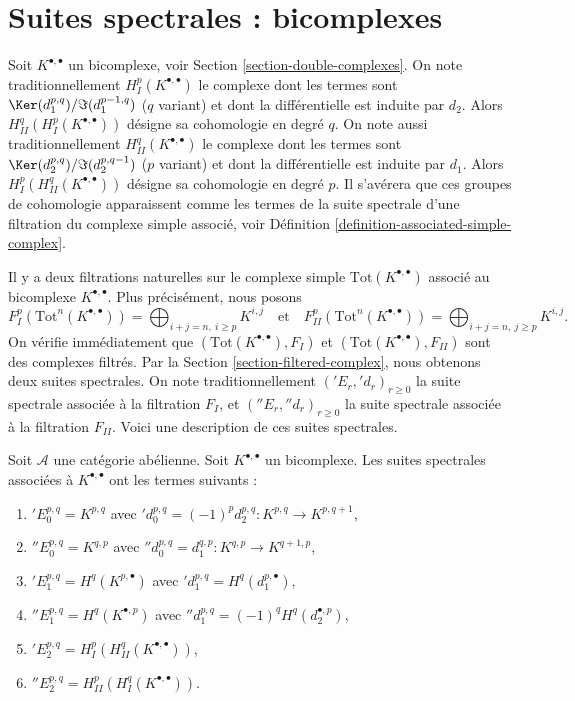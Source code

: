 \section{Suites spectrales : bicomplexes}
\label{section-double-complex}

\noindent
Soit $K^{\bullet, \bullet}$ un bicomplexe, voir
Section \ref{section-double-complexes}. On note traditionnellement
$H^p_I(K^{\bullet, \bullet})$
le complexe dont les termes sont $\Ker(d_1^{p, q})/\Im(d_1^{p - 1, q})$
($q$ variant) et dont la différentielle est induite par $d_2$.
Alors $H^q_{II}(H^p_I(K^{\bullet, \bullet}))$ désigne sa cohomologie en
degré $q$. On note aussi traditionnellement $H^q_{II}(K^{\bullet, \bullet})$
le complexe dont les termes sont $\Ker(d_2^{p, q})/\Im(d_2^{p, q - 1})$
($p$ variant) et dont la différentielle est induite par $d_1$.
Alors $H^p_I(H^q_{II}(K^{\bullet, \bullet}))$ désigne sa cohomologie en
degré $p$. Il s'avérera que ces groupes de cohomologie apparaissent
comme les termes de la suite spectrale d'une filtration du
complexe simple associé, voir
Définition \ref{definition-associated-simple-complex}.

\medskip\noindent
Il y a deux filtrations naturelles sur le complexe simple
$\text{Tot}(K^{\bullet, \bullet})$
associé au bicomplexe $K^{\bullet, \bullet}$. Plus précisément, nous
posons
$$
F_I^p(\text{Tot}^n(K^{\bullet, \bullet})) =
\bigoplus\nolimits_{i + j = n, \ i \geq p} K^{i, j}
\quad
\text{et}
\quad
F_{II}^p(\text{Tot}^n(K^{\bullet, \bullet})) =
\bigoplus\nolimits_{i + j = n, \ j \geq p} K^{i, j}.
$$
On vérifie immédiatement que $(\text{Tot}(K^{\bullet, \bullet}), F_I)$ et
$(\text{Tot}(K^{\bullet, \bullet}), F_{II})$ sont des complexes filtrés.
Par la Section \ref{section-filtered-complex},
nous obtenons deux suites spectrales. On note traditionnellement
$({}'E_r, {}'d_r)_{r \geq 0}$ la suite spectrale associée
à la filtration $F_I$, et $({}''E_r, {}''d_r)_{r \geq 0}$
la suite spectrale associée à la filtration $F_{II}$.
Voici une description de ces suites spectrales.

\begin{lemma}
\label{lemma-ss-double-complex}
Soit $\mathcal{A}$ une catégorie abélienne.
Soit $K^{\bullet, \bullet}$ un bicomplexe.
Les suites spectrales associées à $K^{\bullet, \bullet}$
ont les termes suivants :
\begin{enumerate}
\item ${}'E_0^{p, q} = K^{p, q}$ avec
${}'d_0^{p, q} = (-1)^p d_2^{p, q} : K^{p, q} \to K^{p, q + 1}$,
\item ${}''E_0^{p, q} = K^{q, p}$ avec
${}''d_0^{p, q} = d_1^{q, p} : K^{q, p} \to K^{q + 1, p}$,
\item ${}'E_1^{p, q} = H^q(K^{p, \bullet})$ avec
${}'d_1^{p, q} = H^q(d_1^{p, \bullet})$,
\item ${}''E_1^{p, q} = H^q(K^{\bullet, p})$ avec
${}''d_1^{p, q} = (-1)^q H^q(d_2^{\bullet, p})$,
\item ${}'E_2^{p, q} = H^p_I(H^q_{II}(K^{\bullet, \bullet}))$,
\item ${}''E_2^{p, q} = H^p_{II}(H^q_I(K^{\bullet, \bullet}))$.
\end{enumerate}
\end{lemma}

